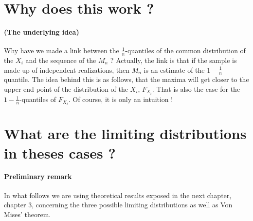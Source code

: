 \section{Why does this work ?}
\paragraph{(The underlying idea)}
Why have we made a link between the $\frac{1}{n}$-quantiles of the common distribution of the $X_i$ and the sequence of the $M_n$ ? Actually, the link is that if the sample is made up of independent realizations, then $M_n$ is an estimate of the $1 - \frac{1}{n}$ quantile. \newline
The idea behind this is as follows, that the maxima will get closer to the upper end-point of the distribution of the $X_i$, $F_{X_i}$. That is also the case for the $1 - \frac{1}{n}$-quantiles of $F_{X_i}$. Of course, it is only an intuition !
\section{What are the limiting distributions in theses cases ?}
\paragraph{Preliminary remark}
In what follows we are using theoretical results exposed in the next chapter, chapter 3, concerning the three possible limiting distributions as well as Von Mises' theorem.
